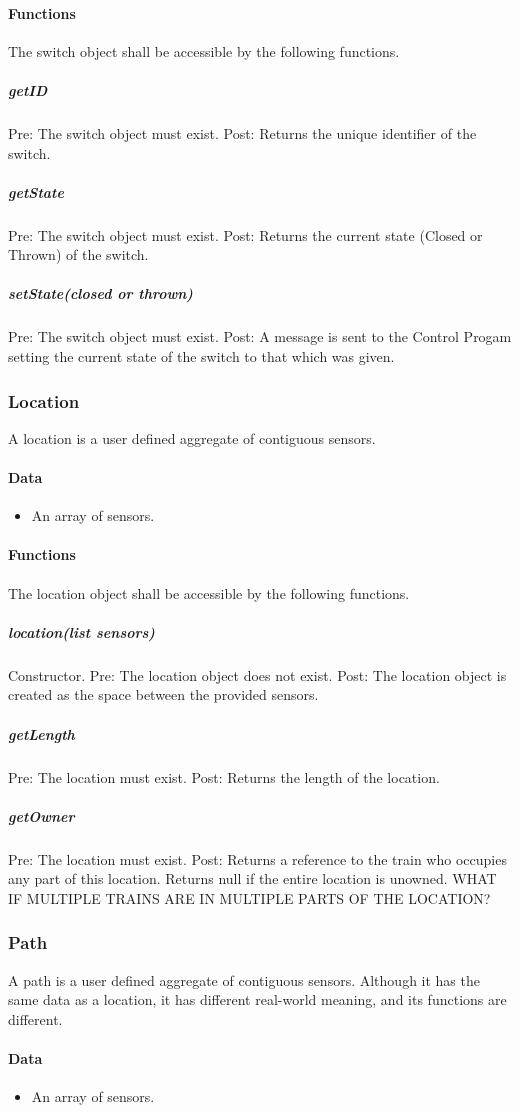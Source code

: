 \documentclass[a4paper,11pt,notitlepage]{article}
\def\CS{Control Progam\xspace} \def\LC{Local Copy of Train State\xspace} \def\TN{Track Node\xspace}
\begin{document}
\paragraph{Functions}
The switch object shall be accessible by the following functions.
\subparagraph{getID} Pre: The switch object must exist. Post: Returns the unique identifier of the switch.
\subparagraph{getState} Pre: The switch object must exist. Post: Returns the current state (Closed or Thrown) of the switch.
\subparagraph{setState(closed or thrown)} Pre: The switch object must exist. Post: A message is sent to the \CS setting the current state of the switch to that which was given.

\subsubsection{Location}
A location is a user defined aggregate of contiguous sensors.
\paragraph{Data}
\begin{itemize}
\item An array of sensors.
\end{itemize}
\paragraph{Functions}
The location object shall be accessible by the following functions.
\subparagraph{location(list sensors)} Constructor. Pre: The location object does not exist. Post: The location object is created as the space between the provided sensors.
\subparagraph{getLength} Pre: The location must exist. Post: Returns the length of the location.
\subparagraph{getOwner} Pre: The location must exist. Post: Returns a reference to the train who occupies any part of this location. Returns null if the entire location is unowned. WHAT IF MULTIPLE TRAINS ARE IN MULTIPLE PARTS OF THE LOCATION?

\subsubsection{Path}
A path is a user defined aggregate of contiguous sensors. Although it has the same data as a location, it has different real-world meaning, and its functions are different.
\paragraph{Data}
\begin{itemize}
\item An array of sensors.
\end{itemize}
\end{document}
